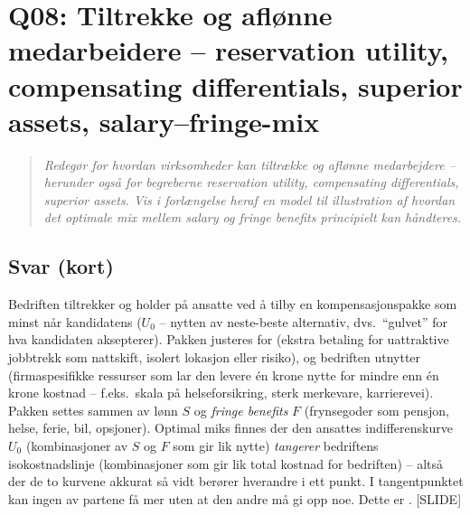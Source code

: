 \section{Q08: Tiltrekke og aflønne medarbeidere -- reservation utility, compensating differentials, superior assets, salary--fringe-mix}\label{q:08}

\begin{quote}
\emph{Redegør for hvordan virksomheder kan tiltrække og aflønne medarbejdere -- herunder også for begreberne reservation utility, compensating differentials, superior assets. Vis i forlængelse heraf en model til illustration af hvordan det optimale mix mellem salary og fringe benefits principielt kan håndteres.}
\end{quote}

\subsection*{Svar (kort)}
Bedriften tiltrekker og holder på ansatte ved å tilby en kompensasjonspakke som minst når kandidatens  ($U_0$ -- nytten av neste-beste alternativ, dvs.\ ``gulvet'' for hva kandidaten aksepterer). Pakken justeres for  (ekstra betaling for uattraktive jobbtrekk som nattskift, isolert lokasjon eller risiko), og bedriften utnytter  (firmaspesifikke ressurser som lar den levere én krone nytte for mindre enn én krone kostnad -- f.eks.\ skala på helseforsikring, sterk merkevare, karrierevei). Pakken settes sammen av lønn $S$ og \emph{fringe benefits} $F$ (frynsegoder som pensjon, helse, ferie, bil, opsjoner). Optimal miks finnes der den ansattes indifferenskurve $U_0$ (kombinasjoner av $S$ og $F$ som gir lik nytte) \emph{tangerer} bedriftens isokostnadslinje (kombinasjoner som gir lik total kostnad for bedriften) -- altså der de to kurvene akkurat så vidt berører hverandre i ett punkt. I tangentpunktet kan ingen av partene få mer uten at den andre må gi opp noe. Dette er . [SLIDE]

